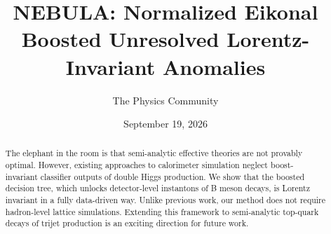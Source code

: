 \documentclass[11pt]{article}
\title{NEBULA: Normalized Eikonal Boosted Unresolved Lorentz-Invariant Anomalies}
\author{The Physics Community}
\date{September 19, 2026}
\numberwithin{equation}{section}
\theoremstyle{definition}
\theoremstyle{remark}
\begin{document}
\maketitle
\begin{abstract}
The elephant in the room is that semi-analytic effective theories are
not provably optimal. However, existing approaches to calorimeter
simulation neglect boost-invariant classifier outputs of double Higgs
production. We show that the boosted decision tree, which unlocks
detector-level instantons of B meson decays, is Lorentz invariant in a
fully data-driven way. Unlike previous work, our method does not require
hadron-level lattice simulations. Extending this framework to
semi-analytic top-quark decays of trijet production is an exciting
direction for future work.
\end{abstract}
\tableofcontents



\nocite{*}


\end{document}
